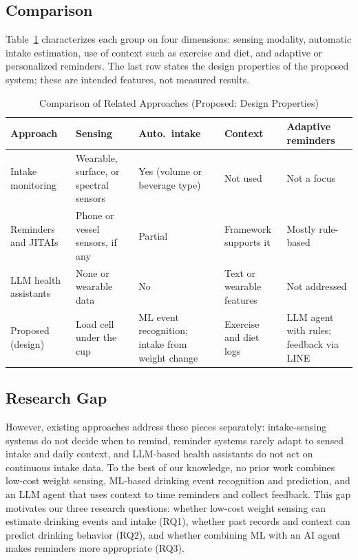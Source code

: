 \documentclass[conference]{IEEEtran}
\begin{document}
\subsection{Comparison}
Table~\ref{tab:rw} characterizes each group on four dimensions: sensing modality, automatic intake estimation, use of context such as exercise and diet, and adaptive or personalized reminders. The last row states the design properties of the proposed system; these are intended features, not measured results.

\begin{table}[htbp]
\caption{Comparison of Related Approaches (Proposed: Design Properties)}
\label{tab:rw}
\centering
\footnotesize
\begin{tabular}{@{}p{}p{}p{}p{}p{}@{}}
\toprule
\textbf{Approach} & \textbf{Sensing} & \textbf{Auto.\ intake} & \textbf{Context} & \textbf{Adaptive reminders} \\
\midrule
Intake monitoring~\cite{cohen2021fluid,lester2010automatic,lessel2016watercoaster} & Wearable, surface, or spectral sensors & Yes (volume or beverage type) & Not used & Not a focus \\
\midrule
Reminders and JITAIs~\cite{chiu2009playful,lessel2016watercoaster,nahumshani2018jitai} & Phone or vessel sensors, if any & Partial & Framework supports it~\cite{nahumshani2018jitai} & Mostly rule-based \\
\midrule
LLM health assistants~\cite{singhal2023llm,kim2024healthllm,yao2023react} & None or wearable data & No & Text or wearable features & Not addressed \\
\midrule
Proposed (design) & Load cell under the cup & ML event recognition; intake from weight change & Exercise and diet logs & LLM agent with rules; feedback via LINE \\
\bottomrule
\end{tabular}
\end{table}

\subsection{Research Gap}
However, existing approaches address these pieces separately: intake-sensing systems do not decide when to remind, reminder systems rarely adapt to sensed intake and daily context, and LLM-based health assistants do not act on continuous intake data. To the best of our knowledge, no prior work combines low-cost weight sensing, ML-based drinking event recognition and prediction, and an LLM agent that uses context to time reminders and collect feedback. This gap motivates our three research questions: whether low-cost weight sensing can estimate drinking events and intake (RQ1), whether past records and context can predict drinking behavior (RQ2), and whether combining ML with an AI agent makes reminders more appropriate (RQ3).
\end{document}
